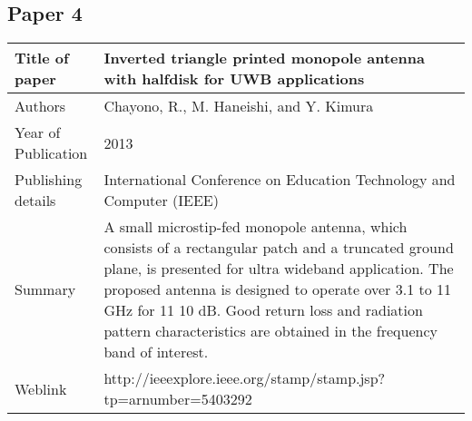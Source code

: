 \documentclass[12pt]{article}
\begin{document}
	  \subsection{Paper 4}
		   	\begin{table}[h]
		   		\centering
		   		\begin{tabular}{ |l|p{11cm}| }
		   			\hline
		   			Title of paper &  Inverted triangle printed monopole antenna with halfdisk for UWB applications \\
		   			\hline
		   			Authors & Chayono, R., M. Haneishi, and Y. Kimura \\
		   			\hline
		   			Year of Publication & 2013 \\
		   			\hline
		   			Publishing details & International Conference on Education Technology and Computer (IEEE) \\ \hline
		   			Summary & A small microstip-fed monopole antenna, which consists of a rectangular patch and a truncated ground plane, is presented for ultra wideband application. The proposed antenna is designed to operate over 3.1 to 11 GHz for 11 10 dB. Good return loss and radiation pattern characteristics are obtained in the frequency band of interest.\\
		   			\hline
		   			Weblink & http://ieeexplore.ieee.org/stamp/stamp.jsp?tp=arnumber=5403292 \\
		   			\hline			 
		   		\end{tabular}		
		   		
		   	\end{table}

  	  \cleardoublepage
  	  
\end{document}
